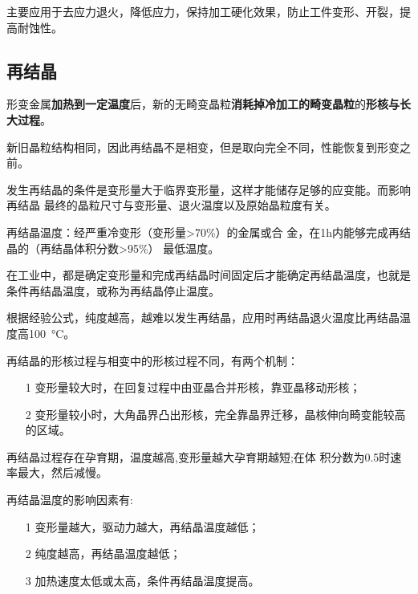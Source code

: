             主要应用于去应力退火，降低应力，保持加工硬化效果，防止工件变形、开裂，提高耐蚀性。

        \subsection{再结晶}
            形变金属\textbf{加热到一定温度}后，新的无畸变晶粒\textbf{消耗掉冷加工的畸变晶粒}的\textbf{形核与长大过程}。

            新旧晶粒结构相同，因此再结晶不是相变，但是取向完全不同，性能恢复到形变之前。

            发生再结晶的条件是变形量大于临界变形量，这样才能储存足够的应变能。而影响再结晶
            最终的晶粒尺寸与变形量、退火温度以及原始晶粒度有关。

            再结晶温度：经严重冷变形（变形量>70\%）的金属或合
            金，在1h内能够完成再结晶的（再结晶体积分数>95\%）
            最低温度。
            
            在工业中，都是确定变形量和完成再结晶时间固定后才能确定再结晶温度，也就是条件再结晶温度，或称为再结晶停止温度。

            根据经验公式，纯度越高，越难以发生再结晶，应用时再结晶退火温度比再结晶温度高\SI{100}{\celsius}。

            再结晶的形核过程与相变中的形核过程不同，有两个机制：
            \begin{itemize}
                \item[1] 变形量较大时，在回复过程中由亚晶合并形核，靠亚晶移动形核；
                \item[2] 变形量较小时，大角晶界凸出形核，完全靠晶界迁移，晶核伸向畸变能较高的区域。
            \end{itemize}

            再结晶过程存在孕育期，温度越高,变形量越大孕育期越短;在体
            积分数为0.5时速率最大，然后减慢。

            再结晶温度的影响因素有:
            \begin{itemize}
                \item[1] 变形量越大，驱动力越大，再结晶温度越低；
                \item[2] 纯度越高，再结晶温度越低；
                \item[3] 加热速度太低或太高，条件再结晶温度提高。
            \end{itemize}
            
